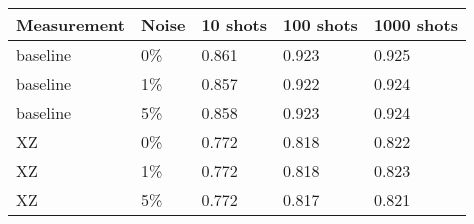 \begin{tabular}{lllll}
\toprule
Measurement & Noise & 10 shots & 100 shots & 1000 shots \\
\midrule
baseline & 0\% & 0.861 & 0.923 & 0.925 \\
baseline & 1\% & 0.857 & 0.922 & 0.924 \\
baseline & 5\% & 0.858 & 0.923 & 0.924 \\
XZ & 0\% & 0.772 & 0.818 & 0.822 \\
XZ & 1\% & 0.772 & 0.818 & 0.823 \\
XZ & 5\% & 0.772 & 0.817 & 0.821 \\
\bottomrule
\end{tabular}

